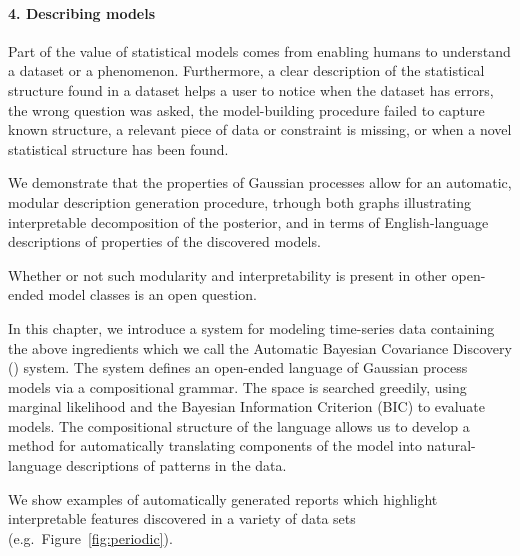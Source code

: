\paragraph{4. Describing models}

Part of the value of statistical models comes from enabling humans to understand a dataset or a phenomenon.
Furthermore, a clear description of the statistical structure found in a dataset helps a user to notice when the dataset has errors, the wrong question was asked, the model-building procedure failed to capture known structure, a relevant piece of data or constraint is missing, or when a novel statistical structure has been found.

We
demonstrate that the properties of Gaussian processes allow for an automatic, modular description generation procedure, trhough both graphs illustrating interpretable decomposition of the posterior, and in terms of English-language descriptions of properties of the discovered models.

Whether or not such modularity and interpretability is present in other open-ended model classes is an open question.



In this chapter, we introduce a system for modeling time-series data containing the above ingredients which we call the Automatic Bayesian Covariance Discovery (\procedurename{}) system.
The system defines an open-ended language of Gaussian process models via a compositional grammar.
The space is searched greedily, using marginal likelihood and the Bayesian Information Criterion (BIC) to evaluate models.
The compositional structure of the language allows us to develop a method for automatically translating components of the model into natural-language descriptions of patterns in the data.

We show examples of automatically generated reports which highlight interpretable features discovered in a variety of data sets (e.g.\ Figure~\ref{fig:periodic}).

